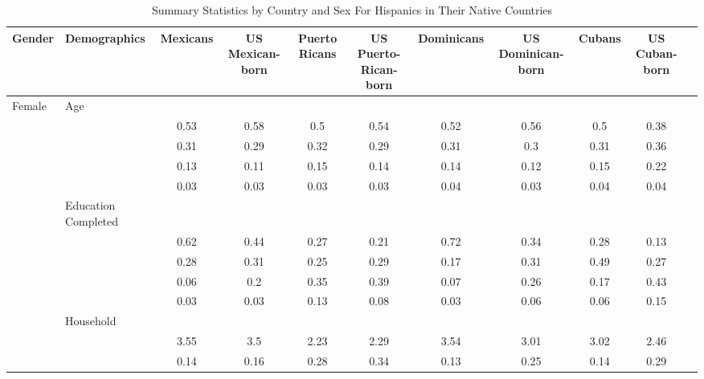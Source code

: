 \begin{table}[ht]
\centering
\caption{Summary Statistics by Country and Sex For Hispanics in Their Native Countries} 
\begingroup\small
\begin{tabular}{l>{\raggedright\arraybackslash}p{3.2cm}|ccccccccc}
  \hline
Gender & Demographics & Mexicans & US Mexican-born & Puerto Ricans & US Puerto-Rican-born & Dominicans & US Dominican-born & Cubans & US Cuban-born \\ 
  \hline
Female & Age &  &  &  &  &  &  &  &  \\ 
   & \multicolumn{1}{>{\raggedleft\arraybackslash}p{1.5cm}|}{\makebox[1.5cm][r]{60 - 69 }} & 0.53 & 0.58 & 0.5 & 0.54 & 0.52 & 0.56 & 0.5 & 0.38 \\ 
   & \multicolumn{1}{>{\raggedleft\arraybackslash}p{1.5cm}|}{\makebox[1.5cm][r]{70 - 79 }} & 0.31 & 0.29 & 0.32 & 0.29 & 0.31 & 0.3 & 0.31 & 0.36 \\ 
   & \multicolumn{1}{>{\raggedleft\arraybackslash}p{1.5cm}|}{\makebox[1.5cm][r]{80 - 89 }} & 0.13 & 0.11 & 0.15 & 0.14 & 0.14 & 0.12 & 0.15 & 0.22 \\ 
   & \multicolumn{1}{>{\raggedleft\arraybackslash}p{1.5cm}|}{\makebox[1.5cm][r]{90 plus }} & 0.03 & 0.03 & 0.03 & 0.03 & 0.04 & 0.03 & 0.04 & 0.04 \\ 
   & Education Completed &  &  &  &  &  &  &  &  \\ 
   & \multicolumn{1}{>{\raggedleft\arraybackslash}p{3.2cm}|}{\makebox[3.2cm][r]{Less than Primary }} & 0.62 & 0.44 & 0.27 & 0.21 & 0.72 & 0.34 & 0.28 & 0.13 \\ 
   & \multicolumn{1}{>{\raggedleft\arraybackslash}p{1.7cm}|}{\makebox[1.7cm][r]{Primary }} & 0.28 & 0.31 & 0.25 & 0.29 & 0.17 & 0.31 & 0.49 & 0.27 \\ 
   & \multicolumn{1}{>{\raggedleft\arraybackslash}p{2cm}|}{\makebox[2cm][r]{Secondary }} & 0.06 & 0.2 & 0.35 & 0.39 & 0.07 & 0.26 & 0.17 & 0.43 \\ 
   & \multicolumn{1}{>{\raggedleft\arraybackslash}p{2cm}|}{\makebox[2cm][r]{University }} & 0.03 & 0.03 & 0.13 & 0.08 & 0.03 & 0.06 & 0.06 & 0.15 \\ 
   & Household &  &  &  &  &  &  &  &  \\ 
   & \multicolumn{1}{>{\raggedleft\arraybackslash}p{2.7cm}|}{\makebox[2.7cm][r]{Household Size }} & 3.55 & 3.5 & 2.23 & 2.29 & 3.54 & 3.01 & 3.02 & 2.46 \\ 
   & \multicolumn{1}{>{\raggedleft\arraybackslash}p{2.2cm}|}{\makebox[2.2cm][r]{Lives Alone }} & 0.14 & 0.16 & 0.28 & 0.34 & 0.13 & 0.25 & 0.14 & 0.29 \\ 

\end{tabular}
\end{table}

